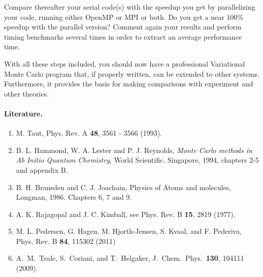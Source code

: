\documentclass[oneside,final,a4wide,10pt]{article}
\begin{document}
Compare thereafter your serial code(s)  with the speedup you get by parallelizing your code, running either OpenMP or MPI or both.
Do you get a near $100\%$ speedup with the parallel version? Comment again your results and perform timing benchmarks several times in order 
to extract  an average performance time. 


With all these steps included, you should now have a professional Variational Monte Carlo program that, if properly written, can be extended to other systems. Furthermore, it provides the basis for making comparisons with experiment and other theories. 



\paragraph{Literature.}
\begin{enumerate}
\item M. Taut, Phys. Rev. A \textbf{48}, 3561 - 3566 (1993).

\item B. L. Hammond, W. A. Lester and P. J. Reynolds, \emph{Monte Carlo methods in Ab Initio Quantum Chemistry}, World Scientific, Singapore, 1994, chapters 2-5 and appendix B.

\item B. H. Bransden and C. J. Joachain, Physics of Atoms and molecules, Longman, 1986. Chapters 6, 7 and 9.

\item A. K.  Rajagopal and J. C. Kimball, see Phys. Rev. B \textbf{15}, 2819 (1977).

\item M. L. Pedersen, G. Hagen, M. Hjorth-Jensen, S. Kvaal,  and F. Pederiva, Phys. Rev. B \textbf{84}, 115302 (2011)

\item A.~M.~Teale, S.~Coriani, and T.~Helgaker, J.~Chem.~Phys.~{\bf 130}, 104111 (2009).

\end{enumerate}
\end{document}

